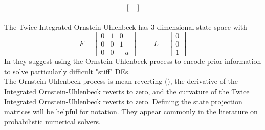{$$\begin{bmatrix}
    \end{bmatrix}$$
    \\ The Twice Integrated Ornstein-Uhlenbeck has 3-dimensional state-space with $$F=\begin{bmatrix}
        0 & 1 & 0 \\ 0 & 0 & 1 \\ 0 & 0 & -a
    \end{bmatrix} \hspace{1cm} L=\begin{bmatrix}
         0 \\ 0 \\  1
    \end{bmatrix}$$
    In \cite{exponential_probabilistic} they suggest using the Ornstein-Uhlenbeck process to encode prior information to solve particularly difficult "stiff" DEs.\\
    The Ornstein-Uhlenbeck process is mean-reverting (\cite{probnum}), the derivative of the Integrated Ornstein-Uhlenbeck reverts to zero, and the curvature of the Twice Integrated Ornstein-Uhlenbeck reverts to zero.
}
Defining the state projection matrices will be helpful for notation. They appear commonly in the literature on probabilistic numerical solvers.

